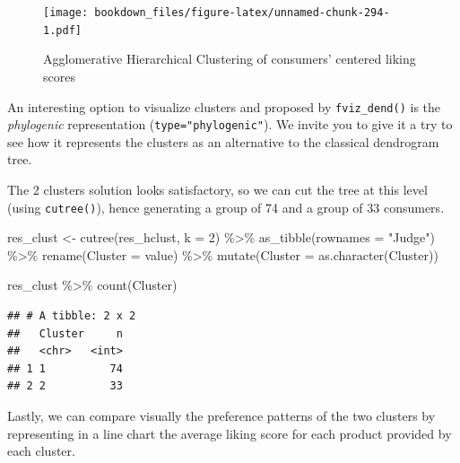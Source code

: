 \documentclass[
]{krantz}
\makeatletter
\newenvironment{Shaded}{\begin{snugshade}}{\end{snugshade}}
\newcommand{\AttributeTok}[1]{\textcolor[rgb]{0.61,0.61,0.61}{#1}}
\newcommand{\DecValTok}[1]{\textcolor[rgb]{0.06,0.06,0.06}{#1}}
\newcommand{\FunctionTok}[1]{\textcolor[rgb]{0,0,0}{#1}}
\newcommand{\NormalTok}[1]{#1}
\newcommand{\OtherTok}[1]{\textcolor[rgb]{0.37,0.37,0.37}{#1}}
\newcommand{\SpecialCharTok}[1]{\textcolor[rgb]{0,0,0}{#1}}
\newcommand{\StringTok}[1]{\textcolor[rgb]{0.5,0.5,0.5}{#1}}
\renewenvironment{quote}{\begin{VF}}{\end{VF}}
\newenvironment{kframe}{%
\medskip{}
\setlength{\fboxsep}{.8em}
 \def\at@end@of@kframe{}%
 \ifinner\ifhmode%
  \def\at@end@of@kframe{\end{minipage}}%
  \begin{minipage}{\columnwidth}%
 \fi\fi%
 \def\FrameCommand##1{\hskip\@totalleftmargin \hskip-\fboxsep
 \colorbox{shadecolor}{##1}\hskip-\fboxsep
     \hskip-\linewidth \hskip-\@totalleftmargin \hskip\columnwidth}%
 \MakeFramed {\advance\hsize-\width
   \@totalleftmargin\z@ \linewidth\hsize
   \@setminipage}}%
 {\par\unskip\endMakeFramed%
 \at@end@of@kframe}
\renewenvironment{Shaded}{\begin{kframe}}{\end{kframe}}
\makeatother
\begin{document}
\begin{figure}
\centering
\texttt{[image: bookdown\_files/figure-latex/unnamed-chunk-294-1.pdf]}
\caption{\label{fig:unnamed-chunk-294}Agglomerative Hierarchical Clustering of consumers' centered liking scores}
\end{figure}

\begin{quote}
An interesting option to visualize clusters and proposed by \texttt{fviz\_dend()} is the \emph{phylogenic} representation (\texttt{type="phylogenic"}). We invite you to give it a try to see how it represents the clusters as an alternative to the classical dendrogram tree.
\end{quote}

The 2 clusters solution looks satisfactory, so we can cut the tree at this level (using \texttt{cutree()}), hence generating a group of 74 and a group of 33 consumers.

\begin{Shaded}
\begin{Highlighting}[]
\NormalTok{res\_clust }\OtherTok{\textless{}{-}} \FunctionTok{cutree}\NormalTok{(res\_hclust, }\AttributeTok{k =} \DecValTok{2}\NormalTok{) }\SpecialCharTok{\%\textgreater{}\%}
  \FunctionTok{as\_tibble}\NormalTok{(}\AttributeTok{rownames =} \StringTok{"Judge"}\NormalTok{) }\SpecialCharTok{\%\textgreater{}\%}
  \FunctionTok{rename}\NormalTok{(}\AttributeTok{Cluster =}\NormalTok{ value) }\SpecialCharTok{\%\textgreater{}\%}
  \FunctionTok{mutate}\NormalTok{(}\AttributeTok{Cluster =} \FunctionTok{as.character}\NormalTok{(Cluster))}

\NormalTok{res\_clust }\SpecialCharTok{\%\textgreater{}\%}
  \FunctionTok{count}\NormalTok{(Cluster)}
\end{Highlighting}
\end{Shaded}

\begin{verbatim}
## # A tibble: 2 x 2
##   Cluster     n
##   <chr>   <int>
## 1 1          74
## 2 2          33
\end{verbatim}

Lastly, we can compare visually the preference patterns of the two clusters by representing in a line chart the average liking score for each product provided by each cluster.
\end{document}
